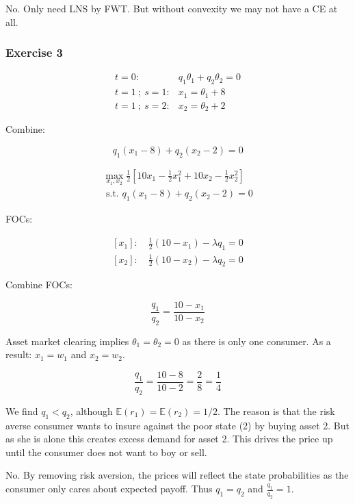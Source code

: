 {{No. Only need LNS by FWT. But without convexity we may not have a CE at all.
}
{
\subsubsection*{Exercise 3}

\begin{enumerate}[label=(\alph*)]
{\item 
$$
\begin{array}{ll}
t=0: & q_{1} \theta_{1}+q_{2} \theta_{2}=0 \\
t=1\: ; \:s=1: & x_{1}=\theta_{1}+8 \\
t=1\: ; \:s=2: & x_{2}=\theta_{2}+2
\end{array}
$$

Combine:

$$
q_{1}\left(x_{1}-8\right)+q_{2}\left(x_{2}-2\right)=0
$$
}
{\item 
$$
\begin{gathered}
\max _{x_{1}, x_{2}} \frac{1}{2}\left[10 x_{1}-\frac{1}{2} x_{1}^{2}+10 x_{2}-\frac{1}{2} x_{2}^{2}\right] \\
\text { s.t. } q_{1}\left(x_{1}-8\right)+q_{2}\left(x_{2}-2\right)=0
\end{gathered}
$$

FOCs:

$$
\begin{gathered}
\left[x_{1}\right]: \quad \frac{1}{2}\left(10-x_{1}\right)-\lambda q_{1}=0 \\
{\left[x_{2}\right]: \quad \frac{1}{2}\left(10-x_{2}\right)-\lambda q_{2}=0}
\end{gathered}
$$

Combine FOCs:

$$
\frac{q_{1}}{q_{2}}=\frac{10-x_{1}}{10-x_{2}}
$$

Asset market clearing implies $\theta_{1}=\theta_{2}=0$ as there is only one consumer. As a result: $x_{1}=w_{1}$ and $x_{2}=w_{2}$.

$$
\frac{q_{1}}{q_{2}}=\frac{10-8}{10-2}=\frac{2}{8}=\frac{1}{4}
$$

We find $q_{1}<q_{2}$, although $\mathbb{E}\left(r_{1}\right)=\mathbb{E}\left(r_{2}\right)=1 / 2$. The reason is that the risk averse consumer wants to insure against the poor state (2) by buying asset 2. But as she is alone this creates excess demand for asset 2. This drives the price up until the consumer does not want to boy or sell.
}
{\item 
No. By removing risk aversion, the prices will reflect the state probabilities as the consumer only cares about expected payoff. Thus $q_{1}=q_{2}$ and $\frac{q_1}{q_2}=1$.
}
\end{enumerate}
}
}